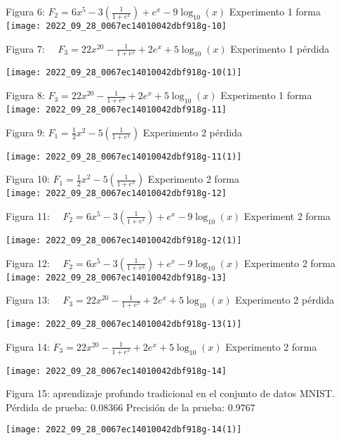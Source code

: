 \documentclass[10pt]{article}
\begin{document}
Figura 6: $F_{2}=6 x^{5}-3\left(\frac{1}{1+e^{x}}\right)+e^{x}-9 \log _{10}(x)$ Experimento 1 forma\\

\texttt{[image: 2022\_09\_28\_0067ec14010042dbf918g-10]}

Figura 7: $\quad F_{3}=22 x^{20}-\frac{1}{1+e^{x}}+2 e^{x}+5 \log _{10}(x)$ Experimento 1 pérdida

\texttt{[image: 2022\_09\_28\_0067ec14010042dbf918g-10(1)]}

Figura 8: $F_{3}=22 x^{20}-\frac{1}{1+e^{x}}+2 e^{x}+5 \log _{10}(x)$ Experimento 1 forma\\

\texttt{[image: 2022\_09\_28\_0067ec14010042dbf918g-11]}

Figura 9: $F_{1}=\frac{1}{2} x^{2}-5\left(\frac{1}{1+e^{x}}\right)$ Experimento 2 pérdida

\texttt{[image: 2022\_09\_28\_0067ec14010042dbf918g-11(1)]}

Figura 10: $F_{1}=\frac{1}{2} x^{2}-5\left(\frac{1}{1+e^{x}}\right)$ Experimento 2 forma\\

\texttt{[image: 2022\_09\_28\_0067ec14010042dbf918g-12]}

Figura 11: $\quad F_{2}=6 x^{5}-3\left(\frac{1}{1+e^{x}}\right)+e^{x}-9 \log _{10}(x)$ Experiment 2 forma

\texttt{[image: 2022\_09\_28\_0067ec14010042dbf918g-12(1)]}

Figura 12: $\quad F_{2}=6 x^{5}-3\left(\frac{1}{1+e^{x}}\right)+e^{x}-9 \log _{10}(x)$ Experimento 2 forma\\

\texttt{[image: 2022\_09\_28\_0067ec14010042dbf918g-13]}

Figura 13: $\quad F_{3}=22 x^{20}-\frac{1}{1+e^{x}}+2 e^{x}+5 \log _{10}(x)$ Experimento 2 pérdida

\texttt{[image: 2022\_09\_28\_0067ec14010042dbf918g-13(1)]}

Figura 14: $F_{3}=22 x^{20}-\frac{1}{1+e^{x}}+2 e^{x}+5 \log _{10}(x)$ Experimento 2 forma

\texttt{[image: 2022\_09\_28\_0067ec14010042dbf918g-14]}

Figura 15: aprendizaje profundo tradicional en el conjunto de datos MNIST. Pérdida de prueba: $0.08366$ Precisión de la prueba: $0.9767$

\texttt{[image: 2022\_09\_28\_0067ec14010042dbf918g-14(1)]}
\end{document}
